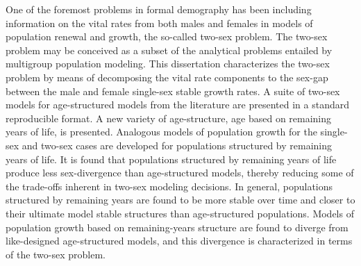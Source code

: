 
One of the foremost problems in formal demography has been including
information on the vital rates from both males and females in models of
population renewal and growth, the so-called two-sex problem. The two-sex
problem may be conceived as a subset of the analytical problems entailed by
multigroup population modeling. This dissertation characterizes the two-sex 
problem by means of decomposing the vital 
rate components to the sex-gap between the male and female single-sex stable growth
rates. A suite of two-sex models for age-structured models from the
literature are presented in a standard reproducible format. A new variety of
age-structure, age based on remaining years of life, is presented. Analogous models of population growth for the
single-sex and two-sex cases are developed for populations structured by
remaining years of life. It is found that populations structured by remaining
years of life produce less sex-divergence than age-structured models,
thereby reducing some of the trade-offs inherent in two-sex modeling decisions.
In general, populations structured by remaining years are found to be more
stable over time and closer to their ultimate model stable structures than
age-structured populations. Models of population growth based on remaining-years 
structure are found to diverge from like-designed age-structured models, and
this divergence is characterized in terms of the two-sex problem.
